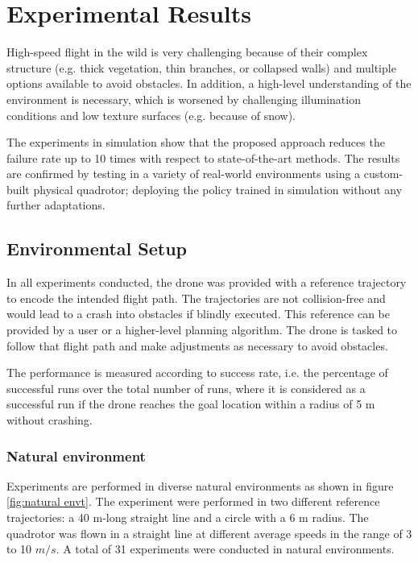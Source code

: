 \chapter{Experimental Results}
High-speed flight in the wild is very challenging because of their complex structure (e.g. thick vegetation, thin branches, or collapsed walls) and multiple options available to avoid obstacles. In addition, a high-level understanding of the environment is necessary, which is worsened by challenging illumination conditions and low texture surfaces (e.g. because of snow). 

The experiments in simulation show that the proposed approach reduces the failure rate up to 10 times with respect to state-of-the-art methods. The results are confirmed by testing in a variety of real-world environments using a custom-built physical quadrotor; deploying the policy trained in simulation without any further adaptations. 

\section{Environmental Setup}
In all experiments conducted, the drone was provided with a reference trajectory to encode the intended flight path. The trajectories are not collision-free and would lead to a crash into obstacles if blindly executed. This reference can be provided by a user or a higher-level planning algorithm. The drone is tasked to follow that flight path and make adjustments as necessary to avoid obstacles. 

The performance is measured according to success rate, i.e. the percentage of successful runs over the total number of runs, where it is considered as a successful run if the drone reaches the goal location within a radius of 5 m without crashing. 

\subsection{Natural environment}
Experiments are performed in diverse natural environments as shown in figure \ref{fig:natural envt}. The experiment were performed in two different reference trajectories: a 40 m-long straight line and a circle with a 6 m radius. The quadrotor was flown in a straight line at different average speeds in the range of 3 to 10 $m/s$. A total of 31 experiments were conducted in natural environments.

